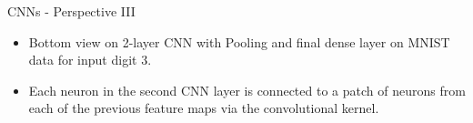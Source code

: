 \begin{vbframe}{CNNs - Perspective III}
\begin{itemize}
\item Bottom view on 2-layer CNN with Pooling and final dense layer on MNIST data for input digit $3$.
\item Each neuron in the second CNN layer is connected to a patch of neurons from each of the previous feature maps via the convolutional kernel.
\end{itemize}
\end{vbframe}



